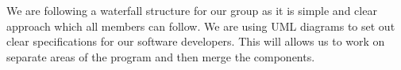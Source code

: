 \documentclass[11pt]{article}
\begin{document}
		We are following a waterfall structure for our group as it is simple and clear approach which all members can follow. 
		We are using UML diagrams to set out clear specifications for our software developers. 
		This will allows us to work on separate areas of the program and then merge the components.  
	
%	
		



	
\end{document}
